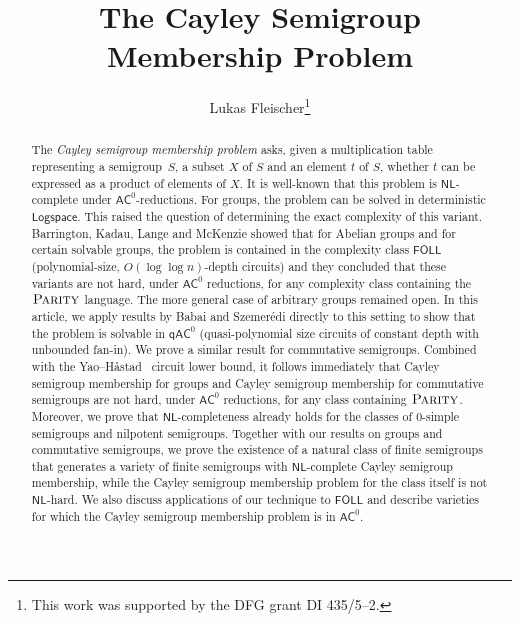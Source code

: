 \documentclass{toc}
\newcommand{\FOLL}{\ensuremath{\mathsf{FOLL}}}
\newcommand{\AC}{\ensuremath{\mathsf{AC}}}
\newcommand{\qAC}{\ensuremath{\mathsf{qAC}}}
\newcommand{\LOGSPACE}{\ensuremath{\mathsf{Logspace}}}
\newcommand{\NL}{\ensuremath{\mathsf{NL}}}
\newcommand{\Parity}{\ensuremath{\textsc{Parity}}}
\newcommand{\SCSM}{Cayley semigroup membership}
\newcommand{\SCSMP}{{\SCSM} problem}
\newcommand{\Hastad}{H{\aa}stad}
\begin{document}
\begin{frontmatter}

\title{The Cayley Semigroup Membership Problem
}
\author[fleischer]{Lukas Fleischer\thanks{This work was supported by the DFG grant DI 435/5--2.}}


%

\end{frontmatter}

\maketitle

\begin{abstract}
  The \emph{Cayley semigroup membership problem} asks, given a multiplication
  table representing a semigroup~$S$, a subset $X$ of $S$ and an element $t$ of
  $S$, whether $t$ can be expressed as a product of elements of $X$.
  It is well-known that this problem is $\NL$-complete
%
%
under $\AC^0$-reductions.  %
For groups, the problem can be solved in deterministic
$\LOGSPACE$.   %
This raised the question of determining the exact complexity of this variant.
  Barrington, Kadau, Lange and McKenzie showed that for Abelian groups and for
  certain solvable groups, the problem is contained in the complexity class
  $\FOLL$  %
  (polynomial-size, $O(\log\log n)$-depth circuits) %
  and they concluded that these variants are not hard,
  under $\AC^0$ reductions,  %
  for any complexity class containing the $\Parity$ language. The more
  general case of arbitrary groups remained open.
  In this %
  article,  %
  we apply results by Babai and Szemer\'edi directly to this
  setting to show that the problem is solvable in $\qAC^0$ (quasi-polynomial
  size circuits of constant depth with unbounded fan-in). We prove a similar
  result for commutative semigroups. Combined with the Yao--\Hastad\
  circuit lower bound,  %
  it follows immediately that {\SCSM} for groups and {\SCSM} for
  commutative semigroups are not hard,
  under $\AC^0$ reductions, %
  for any class containing $\Parity$.
  Moreover, we prove that $\NL$-completeness already holds for the classes
  of $0$-simple semigroups and nilpotent semigroups.
  Together with our results on groups and commutative semigroups, we prove the
  existence of a natural class of finite semigroups that generates a variety of
  finite semigroups with $\NL$-complete {\SCSM}, while the {\SCSMP} for the
  class itself is not $\NL$-hard.
  We also discuss applications of our technique to $\FOLL$ and describe
  varieties for which the {\SCSMP} is in $\AC^0$.
\end{abstract}
\end{document}
